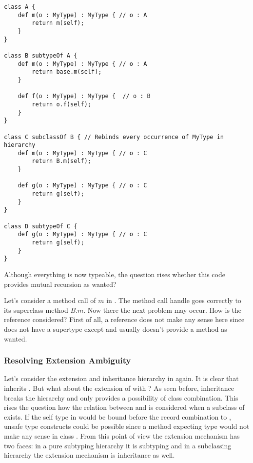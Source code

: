 \begin{lstlisting}[float,language=ooplss,caption=Binding of \self and \mytype in a mixed context,label=lst:bindingInMixedHierarchy]
class A {
	def m(o : MyType) : MyType { // o : A
		return m(self); 
	}
}

class B subtypeOf A {
	def m(o : MyType) : MyType { // o : A
		return base.m(self);
	}

	def f(o : MyType) : MyType {  // o : B
		return o.f(self); 
	}
}

class C subclassOf B { // Rebinds every occurrence of MyType in hierarchy
	def m(o : MyType) : MyType { // o : C
		return B.m(self);
	}

	def g(o : MyType) : MyType { // o : C
		return g(self);
	}
}

class D subtypeOf C {
	def g(o : MyType) : MyType { // o : C
		return g(self);
	}
}
\end{lstlisting}

Although everything is now typeable, the question rises whether this 
code provides mutual
recursion as wanted?  

Let's consider a method call of $m$ in \C. The
method call handle goes correctly to its superclass method $B.m$. Now
there the next problem may occur. How is the \base reference considered?
First of all, a \base reference does not make any sense here since
\C does not have a supertype except \object and \object usually doesn't provide
a method as wanted.

\subsubsection{Resolving Extension Ambiguity}
\label{sec:resolveAmbiguity}
Let's consider the extension and inheritance hierarchy in 
again. It is clear that \C inherits \B. But what about the extension of \A 
with \B? As seen before, inheritance breaks the hierarchy and only
provides a possibility of class combination. This rises the question how the 
relation between \A and \B is considered when a subclass of \B exists. If
the self type in \A would be bound before the record combination to
\C, unsafe type constructs could be possible since a
method expecting type \A would not make any sense in class \C. From this
point of view the extension mechanism has two faces: in a pure
subtyping hierarchy it is subtyping and in a subclassing hierarchy the
extension mechanism is inheritance as well.

